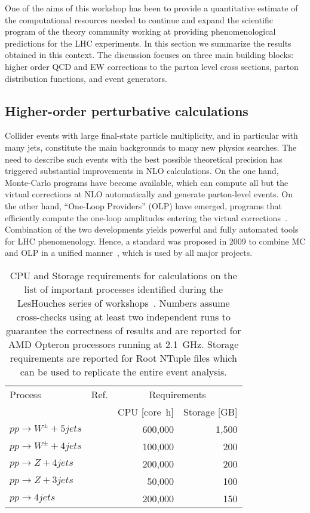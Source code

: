 \documentclass[12pt]{article}
\newcommand{\trademark}{\textsuperscript{\texttrademark}\xspace}
\begin{document}
One of the aims of this workshop has been to provide a
quantitative estimate of the computational resources needed to
continue and expand the scientific program of the theory community
working at providing phenomenological predictions for the LHC
experiments. In this section we summarize the results obtained in
this context. The discussion focuses on three main building
blocks: higher order QCD and EW corrections to the parton level
cross sections, parton distribution functions, and event generators.

\subsection{Higher-order perturbative calculations}
\label{sec:nlo}

Collider events with large final-state particle multiplicity, and in particular 
with many jets, constitute the main backgrounds to many new physics searches.  
The need to describe such events with the best possible theoretical precision
has triggered substantial improvements in NLO calculations. 
On the one hand, Monte-Carlo programs have become available, which can compute 
all but the virtual corrections at NLO automatically and generate parton-level events. 
On the other hand, ``One-Loop Providers'' (OLP) have emerged, programs that 
efficiently compute the one-loop amplitudes entering the virtual corrections~\cite{
Berger:2008sj,Hahn:2000jm,Cullen:2011ac,Hirschi:2011pa,Cascioli:2011va,Reina:2011mb}. 
Combination of the two developments yields powerful and fully automated tools 
for LHC phenomenology. Hence, a standard was proposed in 2009 to combine MC and OLP 
in a unified manner~\cite{Binoth:2010xt}, which is used by all major projects.

\begin{table}
  \centering
  \begin{tabular}{llrr}
    \hline
    Process & Ref. & \multicolumn{2}{c}{Requirements}\\
    & & CPU [core~h] & Storage [GB] \\
    \hline\hline
    $pp\to W^\pm+5 jets$ & \cite{Bern:2013gka} & 600,000 & 1,500 \\
    $pp\to W^\pm+4 jets$ & \cite{Berger:2010zx} & 100,000 & 200\\
    $pp\to Z+4 jets$ & \cite{Ita:2011wn} & 200,000 & 200\\
    $pp\to Z+3 jets$ & \cite{Berger:2010vm} & 50,000 & 100 \\
    $pp\to 4 jets$ & \cite{Bern:2011ep} & 200,000 & 150\\
    \hline
  \end{tabular}
  \caption{CPU and Storage requirements for calculations on the
    list of important processes identified during the LesHouches
    series of workshops~\cite{AlcarazMaestre:2012vp}.
    Numbers assume cross-checks using at least
    two independent runs to guarantee the correctness of results
    and are reported for AMD Opteron\trademark processors running at 2.1~GHz.
    Storage requirements are reported for Root NTuple files which can be used
    to replicate the entire event analysis.
  \label{tab:nlo_wishlist}}
\end{table}
\end{document}
